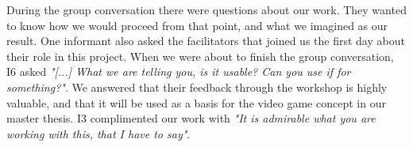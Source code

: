During the group conversation there were questions about our work. They wanted to know how we would proceed from that point, and what we imagined as our result. One informant also asked the facilitators that joined us the first day about their role in this project. When we were about to finish the group conversation, I6 asked \emph{"[...] What we are telling you, is it usable? Can you use if for something?"}. We answered that their feedback through the workshop is highly valuable, and that it will be used as a basis for the video game concept in our master thesis. I3 complimented our work with \emph{"It is admirable what you are working with this, that I have to say"}. 





